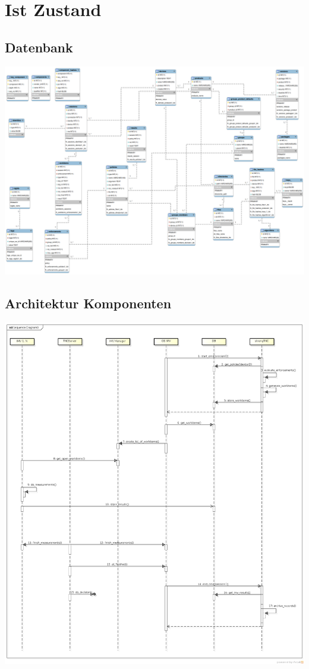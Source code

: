 \section{Ist Zustand}
\subsection{Datenbank}
\includegraphics[scale=0.3, angle=90]{db/database-2014-03-12.png}
\subsection{Architektur Komponenten}
\includegraphics[scale=0.3]{architecture/architecture_sequence_diagramm-2014-03-12}
